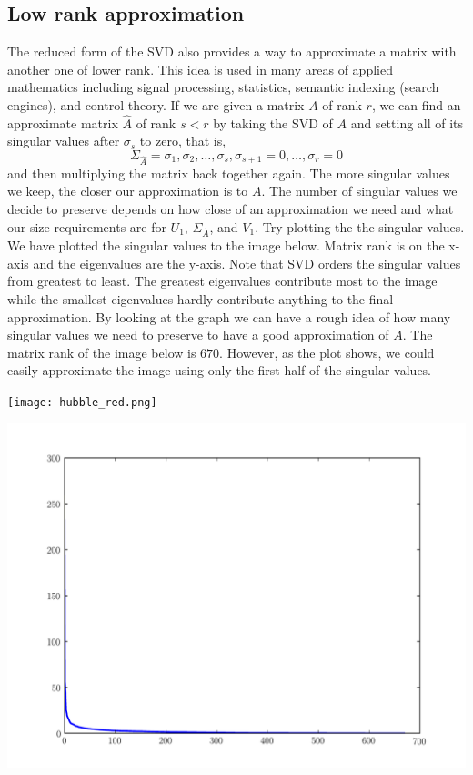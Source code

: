 \subsection*{Low rank approximation}
The reduced form of the SVD also provides a way to approximate a
matrix with another one of lower rank. This idea is used in many areas of applied
mathematics including signal processing, statistics, semantic
indexing (search engines), and control theory.  If we are given a matrix $A$ of rank $r$,
we can find an approximate matrix $\widehat A$ of rank $s<r$ by taking
the SVD of $A$ and setting all of its singular values after
$\sigma_s$ to zero, that is,
\begin{equation*}
\Sigma_{\widehat A} = \sigma_1, \sigma_2, \ldots, \sigma_s,\sigma_{s+1}=0,\ldots,\sigma_r=0
\end{equation*}
and then multiplying the matrix back together again.  The more singular values we keep, the closer our approximation is to $A$.
  The number of singular values we decide to preserve depends on how close of an approximation we need and what our size requirements are for $U_1$, $\Sigma_{\widehat A}$, and $V_1$.
Try plotting the the singular values.  We have plotted the singular values to the image below.  Matrix rank is on the x-axis and the eigenvalues are the y-axis.  Note that SVD orders the singular values from greatest to least.  The greatest eigenvalues contribute most to the image while the smallest eigenvalues hardly contribute anything to the final approximation.  By looking at the graph we can have a rough idea of how many singular values we need to preserve to have a good approximation of $A$.  The matrix rank of the image below is $670$.  However, as the plot shows, we could easily approximate the image using only the first half of the singular values.

\begin{center}
\texttt{[image: hubble\_red.png]}

\includegraphics[scale=.4]{hubble_svals.pdf}
\end{center}

